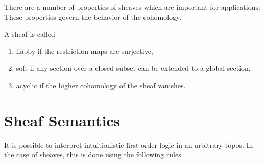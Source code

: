 There are a number of properties of sheaves which are important for applications. These properties govern the behavior of the cohomology.

\begin{definition}
  A sheaf is called
  \begin{enumerate}
    \item flabby if the restriction maps are surjective,
    \item soft if any section over a closed subset can be extended to a global section,
    \item acyclic if the higher cohomology of the sheaf vanishes. 
  \end{enumerate} 
\end{definition}

\section{Sheaf Semantics}
It is possible to interpret intuitionistic first-order logic in an arbitrary topos. In the case of sheaves, this is done using the following rules